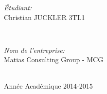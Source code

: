 \begin{titlepage}
\begin{minipage}{0.4\textwidth}
\begin{flushleft} \large
\emph{\'Etudiant:}\\
Christian \textsc{JUCKLER} 3TL1 %
\end{flushleft}
\end{minipage}\\[1cm]
\begin{minipage}{0.4\textwidth}
\begin{flushleft} \large
\emph{Nom de l'entreprise:} \\
Matias Consulting Group - MCG %
\end{flushleft}
\end{minipage}\\[4cm]



{\large Année Académique 2014-2015}\\[3cm] %

\vfill %

\end{titlepage}